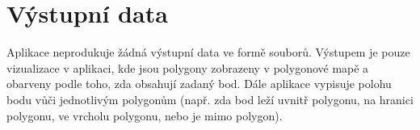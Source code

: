 \section{Výstupní data}

Aplikace neprodukuje žádná výstupní data ve formě souborů. Výstupem je pouze vizualizace v aplikaci, kde jsou polygony zobrazeny v polygonové mapě a obarveny podle toho, zda obsahují zadaný bod. Dále aplikace vypisuje polohu bodu vůči jednotlivým polygonům (např. zda bod leží uvnitř polygonu, na hranici polygonu, ve vrcholu polygonu, nebo je mimo polygon).